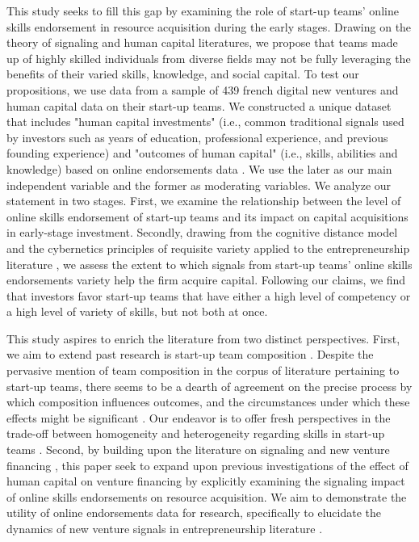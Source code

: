 \documentclass[12pt]{article}
\begin{document}
This study seeks to fill this gap by examining the role of start-up teams' online skills endorsement in resource acquisition during the early stages. Drawing on the theory of signaling and human capital literatures, we propose that teams made up of highly skilled individuals from diverse fields may not be fully leveraging the benefits of their varied skills, knowledge, and social capital. To test our propositions, we use data from a sample of 439 french digital new ventures and human capital data on their start-up teams. We constructed a unique dataset that includes "human capital investments" (i.e., common traditional signals used by investors such as years of education, professional experience, and previous founding experience) and "outcomes of human capital" (i.e., skills, abilities and knowledge) based on online endorsements data \citep{marvel2016human, rapanta2017linkedin}. We use the later as our main independent variable and the former as moderating variables. We analyze our statement in two stages. First, we examine the relationship between the level of online skills endorsement of start-up teams and its impact on capital acquisitions in early-stage investment. Secondly, drawing from the cognitive distance model \citep{nooteboom2007optimal} and the cybernetics principles of requisite variety applied to the entrepreneurship literature \citep{ashby1957introduction, harrison2007s, sundermeier2022entrepreneurial, villani2018entrepreneurial}, we assess the extent to which signals from start-up teams' online skills endorsements variety help the firm acquire capital. Following our claims, we find that investors favor start-up teams that have either a high level of competency or a high level of variety of skills, but not both at once.

This study aspires to enrich the literature from two distinct perspectives. First, we aim to extend past research is start-up team composition \citep{beckman2007early, jung2017entrepreneurial}. Despite the pervasive mention of team composition in the corpus of literature pertaining to start-up teams, there seems to be a dearth of agreement on the precise process by which composition influences outcomes, and the circumstances under which these effects might be significant \citep{klotz2014new, zhou2015entrepreneurial}. Our endeavor is to offer fresh perspectives in the trade-off between homogeneity and heterogeneity regarding skills in start-up teams \citep{sundermeier2022entrepreneurial, villani2018entrepreneurial}. Second, by building upon the literature on signaling and new venture financing \citep{colombo2021use, drover2017review, klein2020start}, this paper seek to expand upon previous investigations of the effect of human capital on venture financing \citep{banerji2019startup, marvel2016human, mollick2014dynamics, reese2020should} by explicitly examining the signaling impact of online skills endorsements on resource acquisition. We aim to demonstrate the utility of online endorsements data for research, specifically to elucidate the dynamics of new venture signals in entrepreneurship literature \citep{perez2016endorsement, gasiorowski2022pay}.
\end{document}
